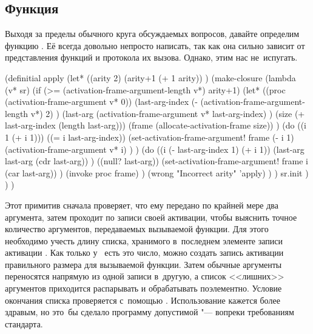 

\subsection{\texorpdfstring{Функция \protect{}}{Функция apply}}%
\label{fast/dilute/ssect:apply}

Выходя за пределы обычного круга обсуждаемых вопросов, давайте определим функцию
. Её всегда довольно непросто написать, так как она сильно зависит от
представления функций и протокола их вызова. Однако, этим нас не~испугать.

\begin{code:lisp}
(definitial apply
  (let* ((arity 2)
         (arity+1 (+ 1 arity)) )
    (make-closure
     (lambda (v* sr)
       (if (>= (activation-frame-argument-length v*) arity+1)
           (let* ((proc (activation-frame-argument v* 0))
                  (last-arg-index
                   (- (activation-frame-argument-length v*) 2) )
                  (last-arg
                   (activation-frame-argument v* last-arg-index) )
                  (size (+ last-arg-index (length last-arg)))
                  (frame (allocate-activation-frame size)) )
             (do ((i 1 (+ i 1)))
                 ((= i last-arg-index))
               (set-activation-frame-argument!
                frame (- i 1) (activation-frame-argument v* i) ) )
             (do ((i (- last-arg-index 1) (+ i 1))
                  (last-arg last-arg (cdr last-arg)) )
                 ((null? last-arg))
               (set-activation-frame-argument! frame i (car last-arg)) )
             (invoke proc frame) )
         (wrong "Incorrect arity" 'apply) ) )
     sr.init ) ) )
\end{code:lisp}

Этот примитив сначала проверяет, что ему передано по крайней мере два аргумента,
затем проходит по записи своей активации, чтобы выяснить точное количество
аргументов, передаваемых вызываемой функции. Для этого необходимо учесть длину
списка, хранимого в~последнем элементе записи активации . Как только
у~ есть это число, можно создать запись активации правильного размера
для вызываемой функции. Затем обычные аргументы переносятся напрямую из одной
записи в~другую, а список <<лишних>> аргументов приходится распарывать и
обрабатывать поэлементно. Условие окончания списка проверяется с~помощью
. Использование  кажется более здравым, но это~бы сделало
программу  допустимой "--- вопреки требованиям
стандарта.

